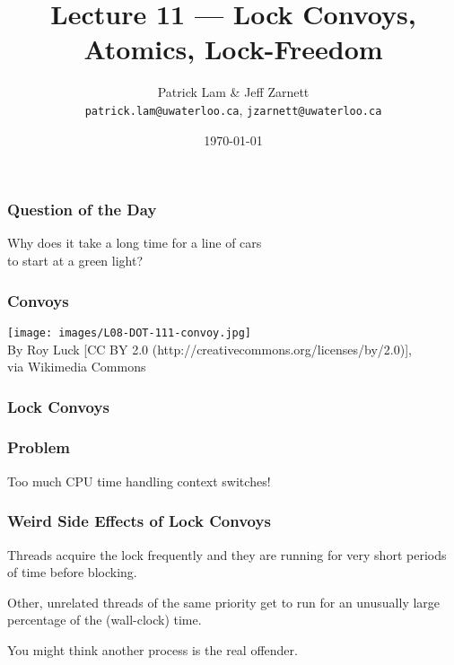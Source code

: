 

\title{Lecture 11 --- Lock Convoys, Atomics, Lock-Freedom}

\author{Patrick Lam \& Jeff Zarnett \\ \small \texttt{patrick.lam@uwaterloo.ca}, \texttt{jzarnett@uwaterloo.ca}}
\date{\today}




\begin{frame}
  \titlepage

 \end{frame}
 

\begin{frame}
\frametitle{Question of the Day}
\Large
\vspace*{-3em}
Why does it take a long time for a line of cars \\
to start at a green light?

\end{frame}

\begin{frame}
\frametitle{Convoys}
\begin{center}
\texttt{[image: images/L08-DOT-111-convoy.jpg]}\\
By Roy Luck [CC BY 2.0 (http://creativecommons.org/licenses/by/2.0)], \\
via Wikimedia Commons
\end{center}
\end{frame}

\begin{frame}
\frametitle{Lock Convoys}
\begin{center}
\scalebox{0.4}{
}
\end{center}
\end{frame}

\begin{frame}
\frametitle{Problem}
\begin{center}
\Large
\vspace*{-2em}
Too much CPU time handling context switches!
\end{center}
\end{frame}

\begin{frame}
\frametitle{Weird Side Effects of Lock Convoys}

Threads acquire the lock frequently and they are running for very short periods of time before blocking. 

Other, unrelated threads of the same priority get to run for an unusually large percentage of the (wall-clock) time. 

You might think another process is the real offender.

\end{frame}

